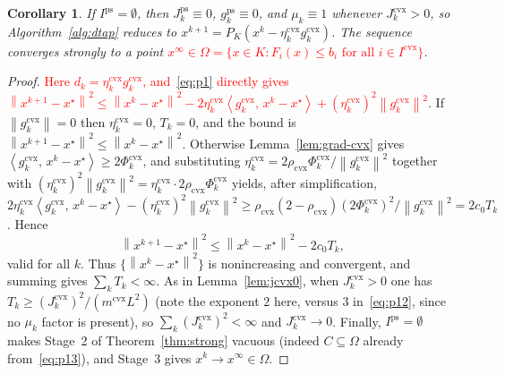 \documentclass[]{interact}
\theoremstyle{plain}
\newtheorem{corollary}[theorem]{Corollary}
\theoremstyle{definition}
\theoremstyle{remark}
\newcommand{\norm}[1]{\left\lVert #1 \right\rVert}
\newcommand{\inner}[2]{\left\langle #1,\, #2 \right\rangle}
\newcommand{\cvx}{\mathrm{cvx}}
\newcommand{\ps}{\mathrm{ps}}
\begin{document}
\begin{corollary}\label{cor:cvx}
If $I^{\ps}=\emptyset$, then $J^{\ps}_k\equiv0$, $g^{\ps}_k\equiv0$, and $\mu_k\equiv1$
whenever $J^{\cvx}_k>0$, so Algorithm~\ref{alg:dtap} reduces to
$x^{k+1}=P_K(x^k-\eta^{\cvx}_k g^{\cvx}_k)$. The sequence converges strongly to a point
\leavevmode\textcolor{red}{$x^\infty\in\Omega=\{x\in K:F_i(x)\le b_i\text{ for all }i\in I^{\cvx}\}$}.
\end{corollary}
\begin{proof}
\leavevmode\textcolor{red}{Here $d_k=\eta^{\cvx}_k g^{\cvx}_k$, and~\eqref{eq:p1} directly gives
$\norm{x^{k+1}-x^\star}^2\le\norm{x^k-x^\star}^2-2\eta^{\cvx}_k\inner{g^{\cvx}_k}{x^k-x^\star}+(\eta^{\cvx}_k)^2\norm{g^{\cvx}_k}^2$}.
If $\norm{g^{\cvx}_k}=0$ then $\eta^{\cvx}_k=0$, $T_k=0$, and the bound is
$\norm{x^{k+1}-x^\star}^2\le\norm{x^k-x^\star}^2$. Otherwise Lemma~\ref{lem:grad-cvx} gives
$\inner{g^{\cvx}_k}{x^k-x^\star}\ge2\Phi^{\cvx}_k$, and substituting
$\eta^{\cvx}_k=2\rho_{\cvx}\Phi^{\cvx}_k/\norm{g^{\cvx}_k}^2$ together with
$(\eta^{\cvx}_k)^2\norm{g^{\cvx}_k}^2=\eta^{\cvx}_k\cdot2\rho_{\cvx}\Phi^{\cvx}_k$ yields, after
simplification,
$2\eta^{\cvx}_k\inner{g^{\cvx}_k}{x^k-x^\star}-(\eta^{\cvx}_k)^2\norm{g^{\cvx}_k}^2\ge\rho_{\cvx}(2-\rho_{\cvx})(2\Phi^{\cvx}_k)^2/\norm{g^{\cvx}_k}^2=2c_0T_k$.
Hence
\begin{equation}\label{eq:p15}
\norm{x^{k+1}-x^\star}^2\le\norm{x^k-x^\star}^2-2c_0T_k ,
\end{equation}
valid for all $k$. Thus $\{\norm{x^k-x^\star}^2\}$ is nonincreasing and convergent, and
summing gives $\sum_k T_k<\infty$. As in Lemma~\ref{lem:jcvx0}, when $J^{\cvx}_k>0$ one has
$T_k\ge(J^{\cvx}_k)^2/(m^{\cvx}L^2)$ (note the exponent $2$ here, versus $3$
in~\eqref{eq:p12}, since no $\mu_k$ factor is present), so $\sum_k(J^{\cvx}_k)^2<\infty$ and
$J^{\cvx}_k\to0$. Finally, $I^{\ps}=\emptyset$ makes Stage~2 of
Theorem~\ref{thm:strong} vacuous (indeed $C\subseteq\Omega$ already
from~\eqref{eq:p13}), and Stage~3 gives $x^k\to x^\infty\in\Omega$.
\end{proof}
\end{document}
